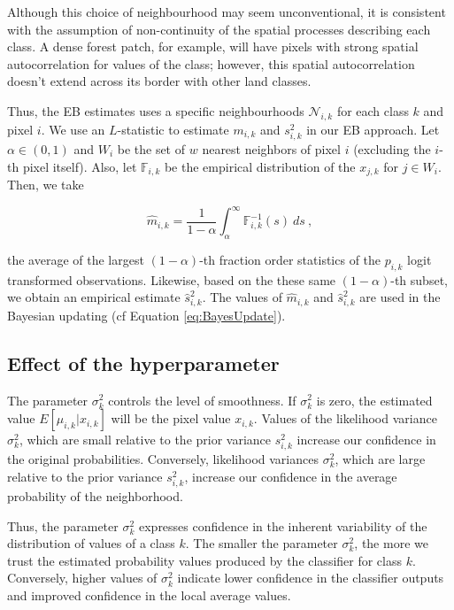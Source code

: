 \documentclass[
  shortnames]{jss}
\begin{document}
Although this choice of neighbourhood may seem unconventional, it is consistent with the assumption of non-continuity of the spatial processes describing each class. A dense forest patch, for example, will have pixels with strong spatial autocorrelation for values of the  class; however, this spatial autocorrelation doesn't extend across its border with other land classes.

Thus, the EB estimates uses a specific neighbourhoods \(\mathcal{N}_{i,k}\) for each class \(k\) and pixel \(i\). We use an \(L\)-statistic to estimate \(m_{i,k}\) and \(s^2_{i,k}\) in our EB approach. Let \(\alpha \in (0, 1)\) and \(W_{i}\) be the set of \(w\) nearest neighbors of pixel \(i\) (excluding the \(i\)-th pixel itself). Also, let \(\mathbb{F}_{i,k}\) be the empirical distribution of the \(x_{j,k}\) for \(j \in W_i\).
Then, we take

\begin{equation}
\hat{m}_{i,k} = \frac{1}{1-\alpha} \int_{\alpha}^{\infty} \mathbb{F}_{i,k}^{-1}(s) ~ ds \: , 
\end{equation}

the average of the largest \((1-\alpha)\)-th fraction order statistics of the \(p_{i,k}\) logit transformed observations. Likewise, based on the these same \((1-\alpha)\)-th subset, we obtain an empirical estimate \(\hat{s}^2_{i,k}\). The values of \(\hat{m}_{i,k}\) and \(\hat{s}^2_{i,k}\) are used in the Bayesian updating (cf Equation \ref{eq:BayesUpdate}).

\hypertarget{effect-of-the-hyperparameter}{%
\subsection{Effect of the hyperparameter}\label{effect-of-the-hyperparameter}}

The parameter \(\sigma^2_k\) controls the level of smoothness. If \(\sigma^2_k\) is zero, the estimated value \({E}[\mu_{i,k} | x_{i,k}]\) will be the pixel value \(x_{i,k}\). Values of the likelihood variance \(\sigma^2_{k}\), which are small relative to the prior variance \(s^2_{i,k}\) increase our confidence in the original probabilities. Conversely, likelihood variances \(\sigma^2_{k}\), which are large relative to the prior variance \(s^2_{i,k}\), increase our confidence in the average probability of the neighborhood.

Thus, the parameter \(\sigma^2_{k}\) expresses confidence in the inherent variability of the distribution of values of a class \(k\). The smaller the parameter \(\sigma^2_{k}\), the more we trust the estimated probability values produced by the classifier for class \(k\).
Conversely, higher values of \(\sigma^2_{k}\) indicate lower confidence in the classifier outputs and improved confidence in the local average values.
\end{document}
